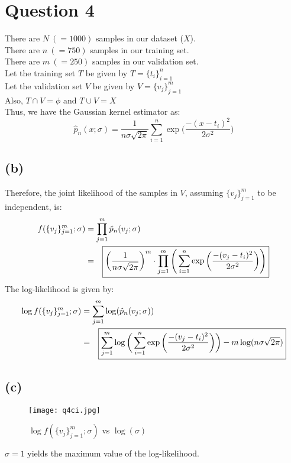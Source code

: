\documentclass[11pt, fleqn]{article}
\begin{document}
\newpage
\section*{Question 4}
\setcounter{equation}{0}
There are $N\ (=1000)$ samples in our dataset ($X$).\\
There are $n\ (=750)$ samples in our training set.\\
There are $m\ (=250)$ samples in our validation set.\\
Let the training set $T$ be given by $T = \{t_i\}_{i=1}^n$\\
Let the validation set $V$ be given by $V = \{v_j\}_{j=1}^m$\\
Also, $T\cap V = \phi$ and $T \cup V = X$\\
Thus, we have the Gaussian kernel estimator as:\\
$$
\hat p_n(x;\sigma) = \frac{1}{n\sigma\sqrt{2\pi}} \sum_{i=1}^{n}\exp\bigg(\frac{-(x - t_i)^2}{2\sigma^2} \bigg)
$$
\subsection*{(b)}
Therefore, the joint likelihood of the samples in $V$, assuming $\{v_j\}_{j=1}^{m}$ to be independent, is:
$$
\begin{aligned}
    f(\{v_j\}_{j=1}^{m}; \sigma) &= \prod_{j=1}^m \hat p_n(v_j;\sigma)\\
    &= \Aboxed{\bigg(\frac{1}{n\sigma\sqrt{2\pi}}\bigg)^m\cdot \prod_{j=1}^m\Bigg( \sum_{i=1}^{n}\exp\bigg(\frac{-(v_j - t_i)^2}{2\sigma^2} \bigg) \Bigg)}
\end{aligned}
$$
The log-likelihood is given by:
$$
\begin{aligned}
    \log f(\{v_j\}_{j=1}^{m}; \sigma) &= \sum_{j=1}^m \log (\hat p_n(v_j;\sigma))\\
    &= \Aboxed{\sum_{j=1}^m \log \bigg(\sum_{i=1}^{n}\exp\bigg(\frac{-(v_j - t_i)^2}{2\sigma^2} \bigg)\bigg) - m\log(n\sigma\sqrt{2\pi})}
\end{aligned}
$$
\subsection*{(c)}
\begin{figure}[H]
    \centering
    \texttt{[image: q4ci.jpg]}
    \caption{$\log f(\{v_j\}_{j=1}^{m}; \sigma)$ vs $\log(\sigma)$}
    \label{fig:my_label}
\end{figure}

$\boxed{\sigma = 1 }$ yields the maximum value of the log-likelihood.
\end{document}
